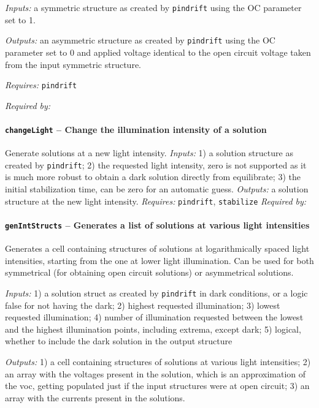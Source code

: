 		\textit{Inputs:} a symmetric structure as created by \texttt{pindrift} using the OC parameter set to 1.
		
		\textit{Outputs:} an asymmetric structure as created by \texttt{pindrift} using the OC
		     parameter set to 0 and applied voltage identical to the open circuit
		     voltage taken from the input symmetric structure.
		     
	\textit{Requires:} \texttt{pindrift}
	
	\textit{Required by:} 

		\paragraph{\texttt{change\-Light} -- Change the illumination intensity of a solution}
		Generate solutions at a new light intensity.
		\textit{Inputs:} 1) a solution structure as created by \texttt{pindrift};
		2) the requested light intensity, zero is not supported as it is
		    much more robust to obtain a dark solution directly from equilibrate;
		3) the initial stabilization time, can be zero for an automatic
		     guess.
		\textit{Outputs:} a solution structure at the new light intensity.
		\textit{Requires:} \texttt{pindrift}, \texttt{stabilize}
			\textit{Required by:} 
			
		\paragraph{\texttt{gen\-Int\-Structs} -- Generates a list of solutions at various light intensities}\label{genIntStructs}
Generates a cell containing structures of solutions at logarithmically spaced light intensities, starting from the one at lower light illumination. Can be used for both symmetrical (for obtaining open circuit solutions) or asymmetrical solutions.

		\textit{Inputs:} 1) a solution struct as created by \texttt{pindrift} in dark conditions, or a logic false for not having the dark; 
		2) highest requested illumination;
		3) lowest requested illumination;
		4) number of illumination requested between the lowest and the highest illumination points, including extrema, except dark;
		5) logical, whether to include the dark solution in the output     structure
		
\textit{Outputs:} 1) a cell containing structures of solutions at various light
     intensities;
2) an array with the voltages present in the solution, which is
     an approximation of the \gls{voc}, getting populated just if the input
     structures were at open circuit;
 3) an array with the currents present in the solutions.
 
